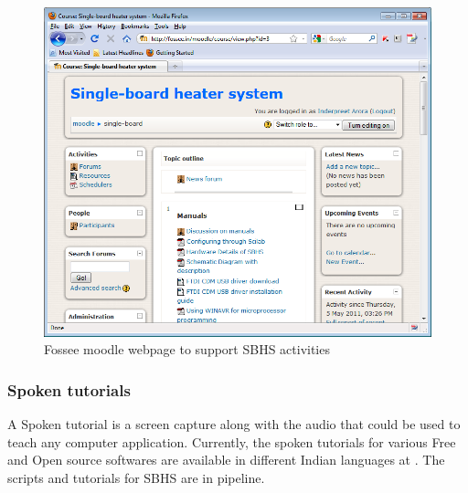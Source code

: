 \begin{figure}
\centering
\includegraphics[width=0.75\linewidth]{IEEE-Chile/figures/fossee-2}
\caption{Fossee moodle webpage to support SBHS activities}
\label{fig:fossee-sup}
\end{figure}



\subsubsection{Spoken tutorials}
A Spoken tutorial is a screen capture along with the audio that could be used to teach any computer application.  Currently, the spoken tutorials for various Free and Open source softwares are available in different Indian languages at \cite{spoken-sci}.  The scripts and tutorials for SBHS are in pipeline.



